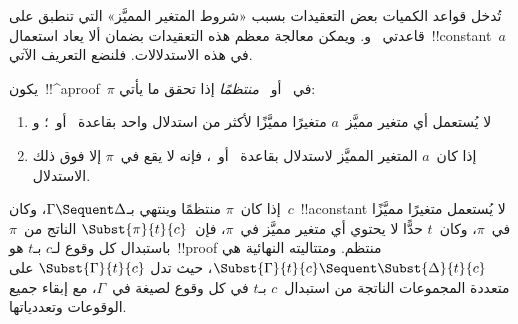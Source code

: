 \documentclass[../../../include/open-logic-section]{subfiles}
\begin{document}


تُدخل قواعد الكميات بعض التعقيدات بسبب «شروط المتغير المميَّز» التي تنطبق
على قاعدتي~\LeftR{\lexists} و\RightR{\lforall}. ويمكن معالجة معظم هذه
التعقيدات بضمان ألا يعاد استعمال~!!{constant}~$a$ في هذه الاستدلالات.
فلنضع التعريف الآتي.

\begin{defn}
يكون~!!^a{proof}~$\pi$ في~ أو~ \emph{منتظمًا} إذا تحقق
ما يأتي:
\begin{enumerate}
  \item لا يُستعمل أي متغير مميَّز~$a$ متغيرًا مميَّزًا لأكثر من استدلال
  واحد بقاعدة~\LeftR{\lexists} أو~\RightR{\lforall}؛ و
  \item إذا كان~$a$ المتغير المميَّز لاستدلال بقاعدة~\LeftR{\lexists}
  أو~\RightR{\lforall}، فإنه لا يقع في~$\pi$ إلا فوق ذلك الاستدلال.
\end{enumerate}
\end{defn}

\begin{lem} إذا كان~$\pi$ منتظمًا وينتهي
بـ$\Gamma \Sequent \Delta$، وكان~$c$~!!a{constant} لا يُستعمل متغيرًا
مميَّزًا في~$\pi$، وكان~$t$ حدًّا لا يحتوي أي متغير مميَّز في~$\pi$،
فإن~$\Subst{\pi}{t}{c}$ الناتج من~$\pi$ باستبدال كل وقوع لـ$c$ بـ$t$
هو~!!{proof} منتظم. ومتتاليته النهائية هي
$\Subst{\Gamma}{t}{c} \Sequent \Subst{\Delta}{t}{c}$، حيث تدل
$\Subst{\Gamma}{t}{c}$ على متعددة المجموعات الناتجة من استبدال~$c$ بـ$t$
في كل وقوع لصيغة في~$\Gamma$، مع إبقاء جميع الوقوعات وتعددياتها.
\end{lem}
\end{document}
